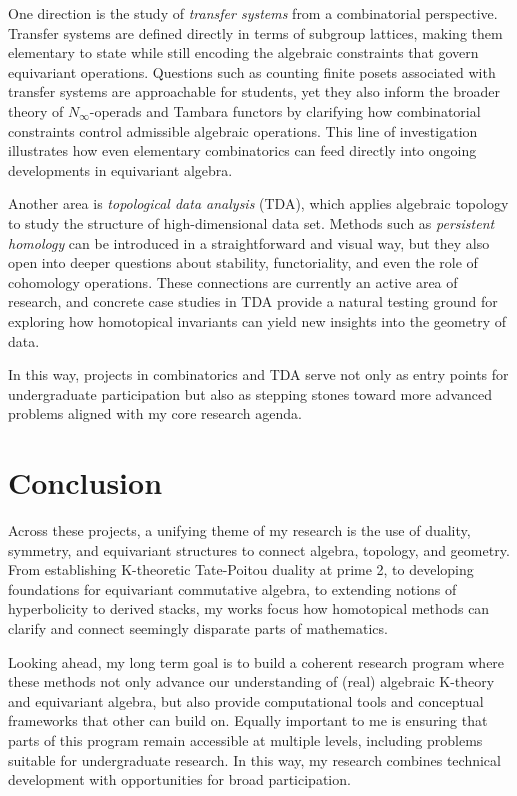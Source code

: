\documentclass[11pt]{article}
\begin{document}
One direction is the study of {\it transfer systems} from a combinatorial perspective.
Transfer systems are defined directly in terms of subgroup lattices, making them elementary to state while still encoding the algebraic constraints that govern equivariant operations.
Questions such as counting finite posets associated with transfer systems are approachable for students, yet they also inform the broader theory of $N_\infty$-operads and Tambara functors by clarifying how combinatorial constraints control admissible algebraic operations.
This line of investigation illustrates how even elementary combinatorics can feed directly into ongoing developments in equivariant algebra.

Another area is {\it topological data analysis} (TDA), which applies algebraic topology to study the structure of high-dimensional data set.
Methods such as {\it persistent homology} can be introduced in a straightforward and visual way, but they also open into deeper questions about stability, functoriality, and even the role of cohomology operations.
These connections are currently an active area of research, and concrete case studies in TDA provide a natural testing ground for exploring how homotopical invariants can yield new insights into the geometry of data.

In this way, projects in combinatorics and TDA serve not only as entry points for undergraduate participation but also as stepping stones toward more advanced problems aligned with my core research agenda.


\section{Conclusion}
Across these projects, a unifying theme of my research is the use of duality, symmetry, and equivariant structures to connect algebra, topology, and geometry.
From establishing K-theoretic Tate-Poitou duality at prime 2, to developing foundations for equivariant commutative algebra, to extending notions of hyperbolicity to derived stacks, my works focus how homotopical methods can clarify and connect seemingly disparate parts of mathematics.

Looking ahead, my long term goal is to build a coherent research program where these methods not only advance our understanding of (real) algebraic K-theory and equivariant algebra, but also provide computational tools and conceptual frameworks that other can build on.
Equally important to me is ensuring that parts of this program remain accessible at multiple levels, including problems suitable for undergraduate research.
In this way, my research combines technical development with opportunities for broad participation.



\end{document}
